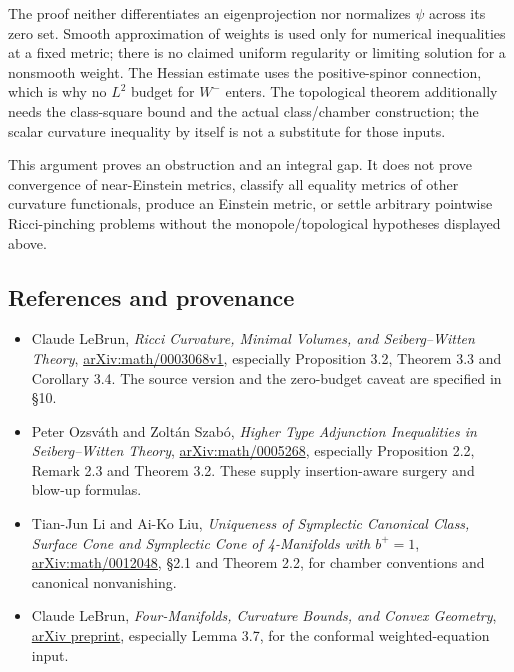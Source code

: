 \documentclass[
  10pt,
]{article}
\providecommand{\tightlist}{%
  \setlength{\itemsep}{0pt}\setlength{\parskip}{0pt}}
\begin{document}
The proof neither differentiates an eigenprojection nor normalizes
\(\psi\) across its zero set. Smooth approximation of weights is used
only for numerical inequalities at a fixed metric; there is no claimed
uniform regularity or limiting solution for a nonsmooth weight. The
Hessian estimate uses the positive-spinor connection, which is why no
\(L^2\) budget for \(W^-\) enters. The topological theorem additionally
needs the class-square bound and the actual class/chamber construction;
the scalar curvature inequality by itself is not a substitute for those
inputs.

This argument proves an obstruction and an integral gap. It does not
prove convergence of near-Einstein metrics, classify all equality
metrics of other curvature functionals, produce an Einstein metric, or
settle arbitrary pointwise Ricci-pinching problems without the
monopole/topological hypotheses displayed above.

\hypertarget{references-and-provenance}{%
\subsection{References and provenance}\label{references-and-provenance}}

\begin{itemize}
\tightlist
\item
  Claude LeBrun, \emph{Ricci Curvature, Minimal Volumes, and
  Seiberg--Witten Theory},
  \href{https://arxiv.org/pdf/math/0003068}{arXiv:math/0003068v1},
  especially Proposition 3.2, Theorem 3.3 and Corollary 3.4. The source
  version and the zero-budget caveat are specified in §10.
\item
  Peter Ozsváth and Zoltán Szabó, \emph{Higher Type Adjunction
  Inequalities in Seiberg--Witten Theory},
  \href{https://arxiv.org/pdf/math/0005268}{arXiv:math/0005268},
  especially Proposition 2.2, Remark 2.3 and Theorem 3.2. These supply
  insertion-aware surgery and blow-up formulas.
\item
  Tian-Jun Li and Ai-Ko Liu, \emph{Uniqueness of Symplectic Canonical
  Class, Surface Cone and Symplectic Cone of 4-Manifolds with
  \(b^+=1\)},
  \href{https://arxiv.org/pdf/math/0012048}{arXiv:math/0012048}, §2.1
  and Theorem 2.2, for chamber conventions and canonical nonvanishing.
\item
  Claude LeBrun, \emph{Four-Manifolds, Curvature Bounds, and Convex
  Geometry}, \href{https://arxiv.org/pdf/math/0611450}{arXiv preprint},
  especially Lemma 3.7, for the conformal weighted-equation input.
\end{itemize}
\end{document}
